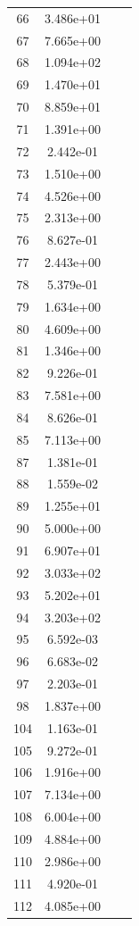 \documentclass[12pt]{article}
\begin{document}
\begin{longtable}{@{}cccc@{}}
66 & 3.486e+01 &  &  \\
67 & 7.665e+00 &  &  \\
68 & 1.094e+02 &  &  \\
69 & 1.470e+01 &  &  \\
70 & 8.859e+01 &  &  \\
71 & 1.391e+00 &  &  \\
72 & 2.442e-01 &  &  \\
73 & 1.510e+00 &  &  \\
74 & 4.526e+00 &  &  \\
75 & 2.313e+00 &  &  \\
76 & 8.627e-01 &  &  \\
77 & 2.443e+00 &  &  \\
78 & 5.379e-01 &  &  \\
79 & 1.634e+00 &  &  \\
80 & 4.609e+00 &  &  \\
81 & 1.346e+00 &  &  \\
82 & 9.226e-01 &  &  \\
83 & 7.581e+00 &  &  \\
84 & 8.626e-01 &  &  \\
85 & 7.113e+00 &  &  \\
87 & 1.381e-01 &  &  \\
88 & 1.559e-02 &  &  \\
89 & 1.255e+01 &  &  \\
90 & 5.000e+00 &  &  \\
91 & 6.907e+01 &  &  \\
92 & 3.033e+02 &  &  \\
93 & 5.202e+01 &  &  \\
94 & 3.203e+02 &  &  \\
95 & 6.592e-03 &  &  \\
96 & 6.683e-02 &  &  \\
97 & 2.203e-01 &  &  \\
98 & 1.837e+00 &  &  \\
104 & 1.163e-01 &  &  \\
105 & 9.272e-01 &  &  \\
106 & 1.916e+00 &  &  \\
107 & 7.134e+00 &  &  \\
108 & 6.004e+00 &  &  \\
109 & 4.884e+00 &  &  \\
110 & 2.986e+00 &  &  \\
111 & 4.920e-01 &  &  \\
112 & 4.085e+00 &  &  \\

\end{longtable}
\end{document}

